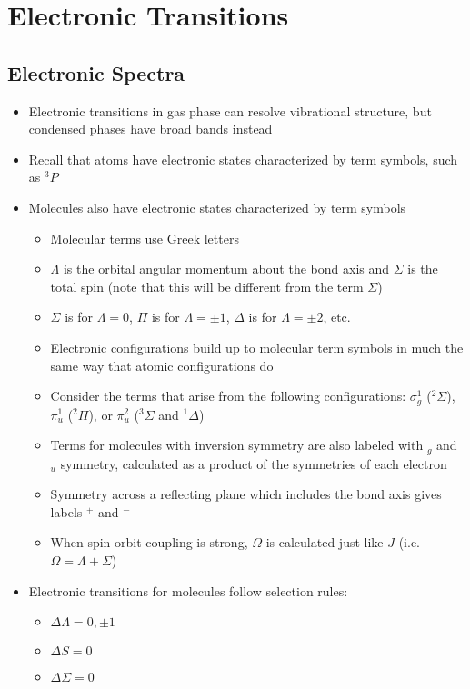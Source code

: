 \documentclass[12pt, openany, letterpaper]{memoir}
\begin{document}
\chapter{Electronic Transitions}
\section{Electronic Spectra}
\begin{itemize}
	\item Electronic transitions in gas phase can resolve vibrational structure, but condensed phases have broad bands instead
	\item Recall that atoms have electronic states characterized by term symbols, such as $^3P$
	\item Molecules also have electronic states characterized by term symbols
	\begin{itemize}
		\item Molecular terms use Greek letters
		\item $\Lambda$ is the orbital angular momentum about the bond axis and $\Sigma$ is the total spin (note that this will be different from the term $\Sigma$)
		\item $\Sigma$ is for $\Lambda=0$, $\Pi$ is for $\Lambda = \pm 1$, $\Delta$ is for $\Lambda = \pm2$, etc.
		\item Electronic configurations build up to molecular term symbols in much the same way that atomic configurations do
		\item Consider the terms that arise from the following configurations: $\sigma_g^1$ ($^2\Sigma$), $\pi_u^1$ ($^2\Pi$), or $\pi_u^2$ ($^3\Sigma$ and $^1\Delta$)
		\item Terms for molecules with inversion symmetry are also labeled with $_g$ and $_u$ symmetry, calculated as a product of the symmetries of each electron
		\item Symmetry across a reflecting plane which includes the bond axis gives labels $^+$ and $^-$
		\item When spin-orbit coupling is strong, $\Omega$ is calculated just like $J$ (i.e. $\Omega = \Lambda + \Sigma$)
	\end{itemize}
	\item Electronic transitions for molecules follow selection rules:
	\begin{itemize}
		\item $\Delta \Lambda = 0, \pm 1$
		\item $\Delta S = 0$
		\item $\Delta \Sigma = 0$

\end{itemize}
\end{itemize}
\end{document}
